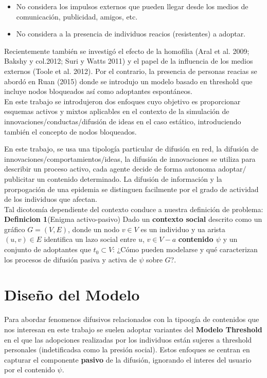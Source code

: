 \documentclass{article}
\begin{document}
\begin{itemize}
	\item No considera los impulsos externos que pueden llegar desde los medios de comunicación, publicidad, amigos, etc.
	\item No considera a la presencia de individuos reacios (resistentes) a adoptar.
\end{itemize}

Recientemente también se investigó el efecto de la homofilia (Aral et al. 2009; Bakshy y col.2012; Suri y Watts 2011) y el papel de la influencia de los medios externos (Toole et al. 2012). Por el contrario, la presencia de personas reacias se abordó en Ruan (2015) donde se introdujo un modelo basado en threshold que incluye nodos bloqueados así como adoptantes espontáneos.
\\
En este trabajo se introdujeron dos enfoques cuyo objetivo es proporcionar esquemas activos y mixtos aplicables en el contexto de la simulación de innovaciones/conductas/difusión de ideas en el caso estático, introduciendo también el concepto de nodos bloqueados.

En este trabajo, se usa una tipología particular de difusión en red, la difusión de innovaciones$/$comportamientos$/$ideas, la difusión de innovaciones se utiliza para describir un proceso activo, cada agente decide de forma autonoma adoptar$/$publicitar un contenido determinado. La difusión de información y la prorpogación de una epidemia se distinguen facilmente por el grado de actividad de los individuos que afectan.\\ 
Tal dicotomía dependiente del contexto conduce a nuestra definición de problema:\\

\textbf{Definicion 1}(Enigma activo-pasivo) Dado un \textbf{contexto social} descrito como un gráfico $G = (V, E)$, donde un nodo $v \in V$ es un individuo y ua arista $(u, v) \in E$ identifica un lazo social entre $u$, $v \in V - a$ \textbf{contenido $\psi$} y un conjunto de adoptantes que $t_0 \subset V$: ¿Cómo pueden modelarse y qué caracterizan los procesos de difusión pasiva y activa de $\psi$ sobre $G$?.
 
\section{Diseño del Modelo}
Para abordar fenomenos difusivos relacionados con la tipoogía de contenidos que nos interesan en este trabajo se suelen adoptar variantes del \textbf{Modelo Threshold} en el que las adopciones realizadas por los individuos están sujeres a threshold personales (indetificadsa como la presión social). Estos enfoques se centran en capturar el componente \textbf{pasivo} de la difusión, ignorando el interes del usuario por el contenido $\psi$.
\end{document}
